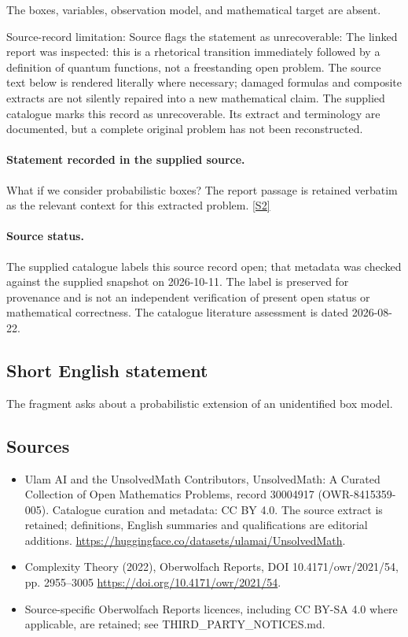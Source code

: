 \documentclass[11pt]{article}
\begin{document}
The boxes, variables, observation model, and mathematical target are absent.

Source-record limitation: Source flags the statement as unrecoverable: The linked report was inspected: this is a rhetorical transition immediately followed by a definition of quantum functions, not a freestanding open problem.
The source text below is rendered literally where necessary; damaged formulas and composite extracts are not silently repaired into a new mathematical claim.
The supplied catalogue marks this record as unrecoverable. Its extract and terminology are documented, but a complete original problem has not been reconstructed.
\paragraph{Statement recorded in the supplied source.}
What if we consider probabilistic boxes? The report passage is retained verbatim as the relevant context for this extracted problem. \href{https://doi.org/10.4171/owr/2021/54}{[S2]}
\paragraph{Source status.}
The supplied catalogue labels this source record open; that metadata was checked against the supplied snapshot on 2026-10-11. The label is preserved for provenance and is not an independent verification of present open status or mathematical correctness. The catalogue literature assessment is dated 2026-08-22.
\subsection{Short English statement}
The fragment asks about a probabilistic extension of an unidentified box model.
\subsection{Sources}
\begin{itemize}
\item[S1] Ulam AI and the UnsolvedMath Contributors, UnsolvedMath: A Curated Collection of Open Mathematics Problems, record 30004917 (OWR-8415359-005). Catalogue curation and metadata: CC BY 4.0. The source extract is retained; definitions, English summaries and qualifications are editorial additions.
\url{https://huggingface.co/datasets/ulamai/UnsolvedMath}.
\item[S2] Complexity Theory (2022), Oberwolfach Reports, DOI 10.4171/owr/2021/54, pp. 2955--3005
\url{https://doi.org/10.4171/owr/2021/54}.
\item Source-specific Oberwolfach Reports licences, including CC BY-SA 4.0 where applicable, are retained; see THIRD\_PARTY\_NOTICES.md.
\end{itemize}
\end{document}
